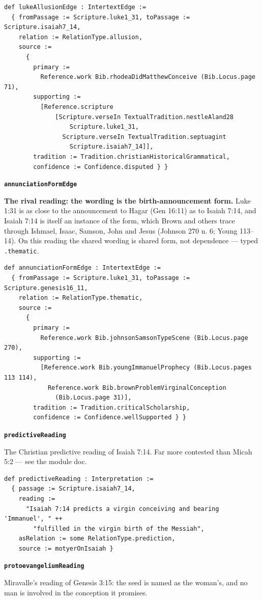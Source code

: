\documentclass[11pt]{article}
\begin{document}
{\small\begin{verbatim}
def lukeAllusionEdge : IntertextEdge :=
  { fromPassage := Scripture.luke1_31, toPassage := Scripture.isaiah7_14,
    relation := RelationType.allusion,
    source :=
      {
        primary :=
          Reference.work Bib.rhodeaDidMatthewConceive (Bib.Locus.page 71),
        supporting :=
          [Reference.scripture
              [Scripture.verseIn TextualTradition.nestleAland28
                  Scripture.luke1_31,
                Scripture.verseIn TextualTradition.septuagint
                  Scripture.isaiah7_14]],
        tradition := Tradition.christianHistoricalGrammatical,
        confidence := Confidence.disputed } }
\end{verbatim}}
\par\medskip\noindent\textbf{\texttt{annunciation\allowbreak{}Form\allowbreak{}Edge}}\par\nobreak\noindent
\textbf{The rival reading: the wording is the birth-announcement form.} Luke 1:31 is as close to the announcement to Hagar (Gen 16:11) as to Isaiah 7:14, and Isaiah 7:14 is itself an instance of the form, which Brown and others trace through Ishmael, Isaac, Samson, John and Jesus (Johnson 270 n. 6; Young 113–14). On this reading the shared wording is shared form, not dependence — typed \texttt{.thematic}.

{\small\begin{verbatim}
def annunciationFormEdge : IntertextEdge :=
  { fromPassage := Scripture.luke1_31, toPassage := Scripture.genesis16_11,
    relation := RelationType.thematic,
    source :=
      {
        primary :=
          Reference.work Bib.johnsonSamsonTypeScene (Bib.Locus.page 270),
        supporting :=
          [Reference.work Bib.youngImmanuelProphecy (Bib.Locus.pages 113 114),
            Reference.work Bib.brownProblemVirginalConception
              (Bib.Locus.page 31)],
        tradition := Tradition.criticalScholarship,
        confidence := Confidence.wellSupported } }
\end{verbatim}}
\par\medskip\noindent\textbf{\texttt{predictive\allowbreak{}Reading}}\par\nobreak\noindent
The Christian predictive reading of Isaiah 7:14. Far more contested than Micah 5:2 — see the module doc.

{\small\begin{verbatim}
def predictiveReading : Interpretation :=
  { passage := Scripture.isaiah7_14,
    reading :=
      "Isaiah 7:14 predicts a virgin conceiving and bearing 'Immanuel', " ++
        "fulfilled in the virgin birth of the Messiah",
    asRelation := some RelationType.prediction,
    source := motyerOnIsaiah }
\end{verbatim}}
\par\medskip\noindent\textbf{\texttt{protoevangelium\allowbreak{}Reading}}\par\nobreak\noindent
Miravalle's reading of Genesis 3:15: the seed is named as the woman's, and no man is involved in the conception it promises.
\end{document}
